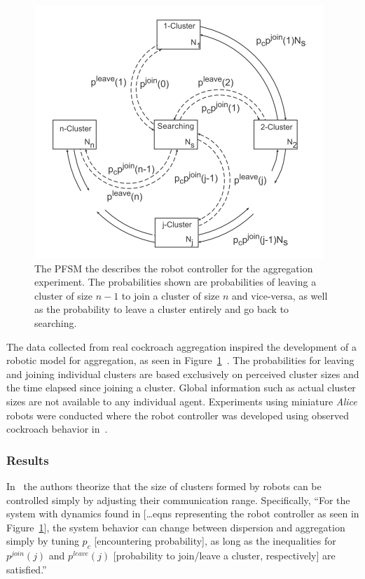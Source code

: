 \documentclass[Main.tex]{subfiles}
\begin{document}
\begin{figure}[!htb]
\centering\includegraphics[width=.5\textwidth]{assets/aggfsm.png}
\caption{The PFSM the describes the robot controller for the aggregation experiment. The probabilities shown are probabilities of leaving a cluster of size $n-1$ to join a cluster of size $n$ and vice-versa, as well as the probability to leave a cluster entirely and go back to searching.}\label{fig:aggfsm}
\end{figure}

The data collected from real cockroach aggregation inspired the development of a robotic model for aggregation, as seen in Figure~\ref{fig:aggfsm}~\cite{Correll2007a}. The probabilities for leaving and joining individual clusters are based exclusively on perceived cluster sizes and the time elapsed since joining a cluster. Global information such as actual cluster sizes are not available to any individual agent. Experiments using miniature \emph{Alice} robots were conducted where the robot controller was developed using observed cockroach behavior in~\cite{Jeanson2005}.

\subsubsection*{Results}
In~\cite{Correll2011} the authors theorize that the size of clusters formed by robots can be controlled simply by adjusting their communication range. Specifically, ``For the system with dynamics found in [\ldots eqns representing the robot controller as seen in Figure~\ref{fig:aggfsm}], the system behavior can change between dispersion and aggregation simply by tuning $p_c$ [encountering probability], as long as the inequalities for $p^{join}(j)$ and $p^{leave}(j)$ [probability to join/leave a cluster, respectively] are satisfied.''
\end{document}
